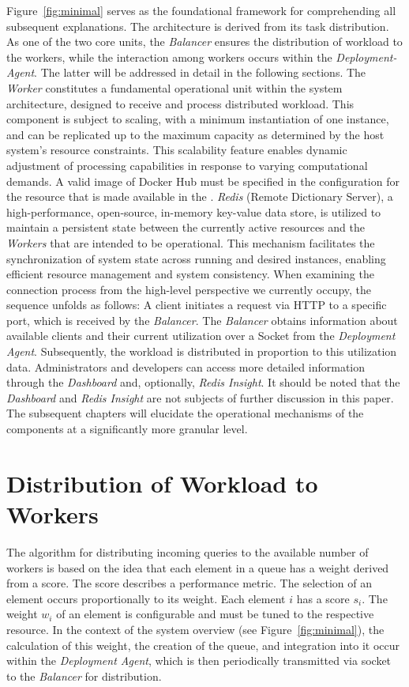\documentclass[twocolumn]{webofc}
\begin{document}
    Figure~\ref{fig:minimal} serves as the foundational framework for comprehending all subsequent explanations. The architecture is derived from its task distribution. As one of the two core units, the \textit{Balancer} ensures the distribution of workload to the workers, while the interaction among workers occurs within the \textit{Deployment-Agent}. The latter will be addressed in detail in the following sections. The \textit{Worker} constitutes a fundamental operational unit within the system architecture, designed to receive and process distributed workload. This component is subject to scaling, with a minimum instantiation of one instance, and can be replicated up to the maximum capacity as determined by the host system's resource constraints. This scalability feature enables dynamic adjustment of processing capabilities in response to varying computational demands. A valid image of Docker Hub must be specified in the configuration for the resource that is made available in the .
    \textit{Redis} (Remote Dictionary Server)\cite{redis_docs}, a high-performance, open-source, in-memory key-value data store, is utilized to maintain a persistent state between the currently active resources and the \textit{Workers} that are intended to be operational. This mechanism facilitates the synchronization of system state across running and desired instances, enabling efficient resource management and system consistency. When examining the connection process from the high-level perspective we currently occupy, the sequence unfolds as follows: A client initiates a request via HTTP to a specific port, which is received by the \textit{Balancer}. The \textit{Balancer} obtains information about available clients and their current utilization over a Socket from the \textit{Deployment Agent}. Subsequently, the workload is distributed in proportion to this utilization data.
    Administrators and developers can access more detailed information through the \textit{Dashboard} and, optionally, \textit{Redis Insight}. It should be noted that the \textit{Dashboard} and \textit{Redis Insight} are not subjects of further discussion in this paper.
    The subsequent chapters will elucidate the operational mechanisms of the components at a significantly more granular level.

    \section{Distribution of Workload to Workers}
    The algorithm for distributing incoming queries to the available number of workers is based on the idea that each element in a queue has a weight derived from a score. The score describes a performance metric. The selection of an element occurs proportionally to its weight. Each element \(i\) has a score \(s_i\). The weight \(w_i\) of an element is configurable and must be tuned to the respective resource. In the context of the system overview (see Figure~\ref{fig:minimal}), the calculation of this weight, the creation of the queue, and integration into it occur within the \textit{Deployment Agent}, which is then periodically transmitted via socket to the \textit{Balancer} for distribution.
\end{document}
